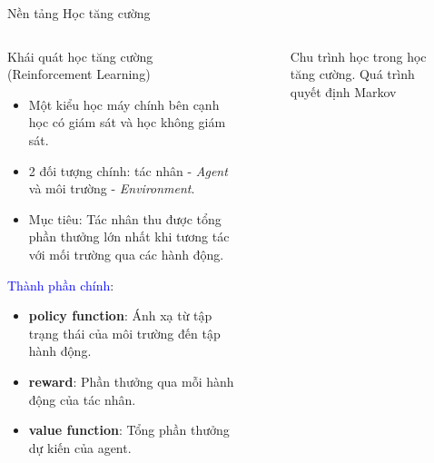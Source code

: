 	\begin{frame}{Nền tảng Học tăng cường}
		\begin{columns}
        \begin{itemize}
    		\begin{block}{Khái quát học tăng cường (Reinforcement Learning)}
    		    \begin{itemize}
    		    \setlength\itemsep{0.01em}
    		    \item Một kiểu học máy chính bên cạnh học có giám sát và học không giám sát.
    		    \item 2 đối tượng chính: tác nhân - \emph{Agent} và môi trường - \emph{Environment}.
    		    \item Mục tiêu: Tác nhân thu được tổng phần thưởng lớn nhất khi tương tác với mối trường qua các hành động.
    		    \end{itemize}
    		    \textcolor{blue}{Thành phần chính}:
    		    \begin{itemize}
    		        \setlength\itemsep{0.01em}
        		    \item \textbf{policy function}: Ánh xạ từ tập trạng thái của môi trường đến tập hành động.
        		    \item \textbf{reward}: Phần thưởng qua mỗi hành động của tác nhân.
        		    \item \textbf{value function}: Tổng phần thưởng dự kiến của agent.
    		    \end{itemize}
    		\end{block}
		\end{itemize}
		\begin{figure}[ht]
            \caption{Chu trình học trong học tăng cường. Quá trình quyết định Markov}
            \label{fig:problem:mdp}
        \end{figure}
		\end{columns}
	\end{frame}
